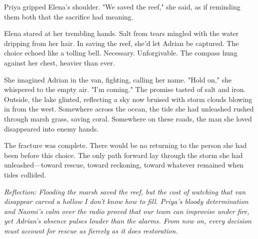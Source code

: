 Priya gripped Elena's shoulder. "We saved the reef," she said, as if reminding them both that the sacrifice had meaning.

Elena stared at her trembling hands. Salt from tears mingled with the water dripping from her hair. In saving the reef, she'd let Adrian be captured. The choice echoed like a tolling bell. Necessary. Unforgivable. The compass hung against her chest, heavier than ever.

She imagined Adrian in the van, fighting, calling her name. "Hold on," she whispered to the empty air. "I'm coming." The promise tasted of salt and iron. Outside, the lake glinted, reflecting a sky now bruised with storm clouds blowing in from the west. Somewhere across the ocean, the tide she had unleashed rushed through marsh grass, saving coral. Somewhere on these roads, the man she loved disappeared into enemy hands.

The fracture was complete. There would be no returning to the person she had been before this choice. The only path forward lay through the storm she had unleashed—toward rescue, toward reckoning, toward whatever remained when tides collided.


\noindent\textit{Reflection: Flooding the marsh saved the reef, but the cost of watching that van disappear carved a hollow I don't know how to fill. Priya's bloody determination and Naomi's calm over the radio proved that our team can improvise under fire, yet Adrian's absence pulses louder than the alarms. From now on, every decision must account for rescue as fiercely as it does restoration.}
